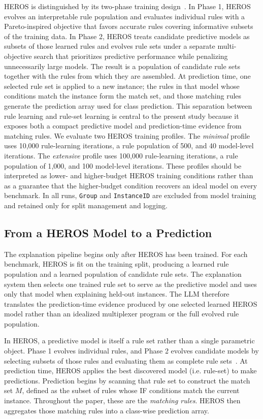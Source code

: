 \documentclass[sigconf]{acmart}
\begin{document}
HEROS is distinguished by its two-phase training design~\cite{lipschutzvilla2025heros}. In Phase 1, HEROS evolves an interpretable rule population and evaluates individual rules with a Pareto-inspired objective that favors accurate rules covering informative subsets of the training data. In Phase 2, HEROS treats candidate predictive models as subsets of those learned rules and evolves rule sets under a separate multi-objective search that prioritizes predictive performance while penalizing unnecessarily large models. The result is a population of candidate rule sets together with the rules from which they are assembled. At prediction time, one selected rule set is applied to a new instance; the rules in that model whose conditions match the instance form the match set, and those matching rules generate the prediction array used for class prediction. This separation between rule learning and rule-set learning is central to the present study because it exposes both a compact predictive model and prediction-time evidence from matching rules. We evaluate two HEROS training profiles. The \emph{minimal} profile uses 10{,}000 rule-learning iterations, a rule population of 500, and 40 model-level iterations. The \emph{extensive} profile uses 100{,}000 rule-learning iterations, a rule population of 1{,}000, and 100 model-level iterations. These profiles should be interpreted as lower- and higher-budget HEROS training conditions rather than as a guarantee that the higher-budget condition recovers an ideal model on every benchmark. In all runs, \texttt{Group} and \texttt{InstanceID} are excluded from model training and retained only for split management and logging.

\subsection{From a HEROS Model to a Prediction}
The explanation pipeline begins only after HEROS has been trained. For each benchmark, HEROS is fit on the training split, producing a learned rule population and a learned population of candidate rule sets. The explanation system then selects one trained rule set to serve as the predictive model and uses only that model when explaining held-out instances. The LLM therefore translates the prediction-time evidence produced by one selected learned HEROS model rather than an idealized multiplexer program or the full evolved rule population.

In HEROS, a predictive model is itself a rule set rather than a single parametric object. Phase 1 evolves individual rules, and Phase 2 evolves candidate models by selecting subsets of those rules and evaluating them as complete rule sets~\cite{lipschutzvilla2025heros}. At prediction time, HEROS applies the best discovered model (i.e. rule-set) to make predictions. Prediction begins by scanning that rule set to construct the match set $M$, defined as the subset of rules whose IF conditions match the current instance. Throughout the paper, these are the \emph{matching rules}. HEROS then aggregates those matching rules into a class-wise prediction array.
\end{document}
